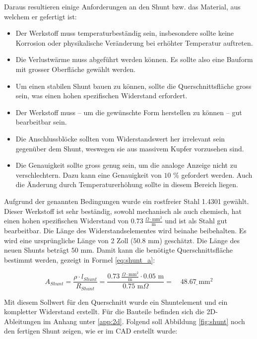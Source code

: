 Daraus resultieren einige Anforderungen an den Shunt bzw. das Material, aus welchem er gefertigt ist: \begin{itemize}
	\item Der Werkstoff muss temperaturbeständig sein, insbesondere sollte keine Korrosion oder physikalische Veränderung bei erhöhter Temperatur auftreten.
	\item Die Verlustwärme muss abgeführt werden können. Es sollte also eine Bauform mit grosser Oberfläche gewählt werden.
	\item Um einen stabilen Shunt bauen zu können, sollte die Querschnittsfläche gross sein, was einen hohen spezifischen Widerstand erfordert.
	\item Der Werkstoff muss -- um die gewünschte Form herstellen zu können -- gut bearbeitbar sein.
	\item Die Anschlussblöcke sollten vom Widerstandswert her irrelevant sein gegenüber dem Shunt, weswegen sie aus massivem Kupfer vorzusehen sind.
	\item Die Genauigkeit sollte gross genug sein, um die analoge Anzeige nicht zu verschlechtern. Dazu kann eine Genauigkeit von $10$ \% gefordert werden. Auch die Änderung durch Temperaturerhöhung sollte in diesem Bereich liegen.
\end{itemize}

Aufgrund der genannten Bedingungen wurde ein rostfreier Stahl 1.4301 \cite{4301} gewählt. Dieser Werkstoff ist sehr beständig, sowohl mechanisch als auch chemisch, hat einen hohen spezifischen Widerstand von $0.73\ \frac{\Omega \cdot \text{mm}^2}{\text{m}}$ und ist als Stahl gut bearbeitbar. Die Länge des Widerstandselementes wird beinahe beibehalten. Es wird eine ursprüngliche Länge von 2 Zoll ($50.8$ mm) geschätzt. Die Länge des neuen Shunts beträgt $50$ mm. Damit kann die benötigte Querschnittsfläche bestimmt werden, gezeigt in Formel \ref{eq:shunt_a}:

\begin{equation}
	A_{Shunt}=\frac{\rho\cdot l_{Shunt}}{R_{Shunt}}=\frac{0.73\ \frac{\Omega\cdot\text{mm}^2}{\text{m}}\cdot 0.05\text{ m}}{0.75\text{ m}\Omega}=\quad\underline{48.67\text{ mm}^2}
\label{eq:shunt_a}
\end{equation}

Mit diesem Sollwert für den Querschnitt wurde ein Shuntelement und ein kompletter Widerstand erstellt. Für die Bauteile befinden sich die 2D-Ableitungen im Anhang unter \ref{app:2d}. Folgend soll Abbildung \ref{fig:shunt} noch den fertigen Shunt zeigen, wie er im CAD erstellt wurde:

